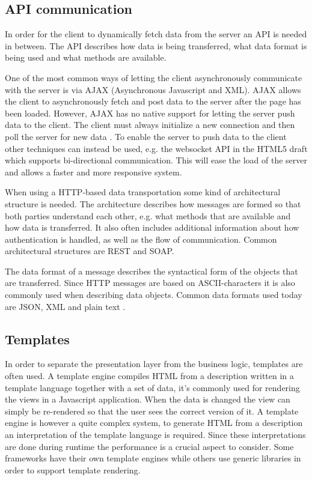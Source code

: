 \subsection{API communication}

In order for the client to dynamically fetch data from the server an API is needed in between. The API describes how data is being transferred, what data format is being used and what methods are available.

One of the most common ways of letting the client asynchronously communicate with the server is via AJAX (Asynchronous Javascript and XML). AJAX allows the client to asynchronously fetch and post data to the server after the page has been loaded. However, AJAX has no native support for letting the server push data to the client. The client must always initialize a new connection and then poll the server for new data \cite[p. 491]{js_def_guide}. To enable the server to push data to the client other techniques can instead be used, e.g. the websocket API in the HTML5 draft which supports bi-directional communication. This will ease the load of the server and allows a faster and more responsive system.

When using a HTTP-based data transportation some kind of architectural structure is needed. The architecture describes how messages are formed so that both parties understand each other, e.g. what methods that are available and how data is transferred. It also often includes additional information about how authentication is handled, as well as the flow of communication. Common architectural structures are REST and SOAP.

The data format of a message describes the syntactical form of the objects that are transferred. Since HTTP messages are based on ASCII-characters \cite{http_rfc_message_standard} it is also commonly used when describing data objects. Common data formats used today are JSON, XML and plain text \cite{grb_wapi_rest}. 

\subsection{Templates}

In order to separate the presentation layer from the business logic, templates are often used. A template engine compiles HTML from a description written in a template language together with a set of data, it's commonly used for rendering the views in a Javascript application. When the data is changed the view can simply be re-rendered so that the user sees the correct version of it. A template engine is however a quite complex system, to generate HTML from a description an interpretation of the template language is required. Since these interpretations are done during runtime the performance is a crucial aspect to consider. Some frameworks have their own template engines while others use generic libraries in order to support template rendering. 

